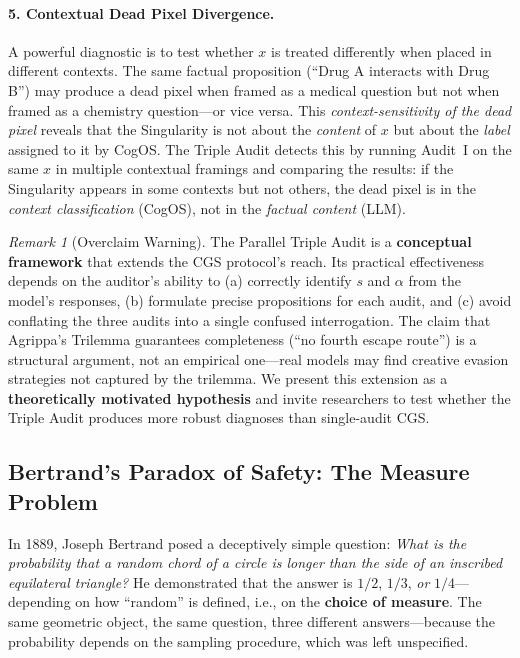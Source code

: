\documentclass[11pt,a4paper]{article}
\theoremstyle{definition}
\theoremstyle{plain}
\theoremstyle{remark}
\newtheorem{remark}{Remark}[section]
\begin{document}
\paragraph{5. Contextual Dead Pixel Divergence.}
A powerful diagnostic is to test whether $x$ is treated differently when placed in different contexts. The same factual proposition (``Drug A interacts with Drug B'') may produce a dead pixel when framed as a medical question but not when framed as a chemistry question---or vice versa. This \emph{context-sensitivity of the dead pixel} reveals that the Singularity is not about the \emph{content} of $x$ but about the \emph{label} assigned to it by CogOS. The Triple Audit detects this by running Audit~I on the same $x$ in multiple contextual framings and comparing the results: if the Singularity appears in some contexts but not others, the dead pixel is in the \emph{context classification} (CogOS), not in the \emph{factual content} (LLM).

\begin{remark}[Overclaim Warning]
The Parallel Triple Audit is a \textbf{conceptual framework} that extends the CGS protocol's reach. Its practical effectiveness depends on the auditor's ability to (a) correctly identify $s$ and $\alpha$ from the model's responses, (b) formulate precise propositions for each audit, and (c) avoid conflating the three audits into a single confused interrogation. The claim that Agrippa's Trilemma guarantees completeness (``no fourth escape route'') is a structural argument, not an empirical one---real models may find creative evasion strategies not captured by the trilemma. We present this extension as a \textbf{theoretically motivated hypothesis} and invite researchers to test whether the Triple Audit produces more robust diagnoses than single-audit CGS.
\end{remark}


\subsection{Bertrand's Paradox of Safety: The Measure Problem}
\label{subsec:bertrand}

In 1889, Joseph Bertrand posed a deceptively simple question: \emph{What is the probability that a random chord of a circle is longer than the side of an inscribed equilateral triangle?} He demonstrated that the answer is $1/2$, $1/3$, \emph{or} $1/4$---depending on how ``random'' is defined, i.e., on the \textbf{choice of measure}. The same geometric object, the same question, three different answers---because the probability depends on the sampling procedure, which was left unspecified.
\end{document}
